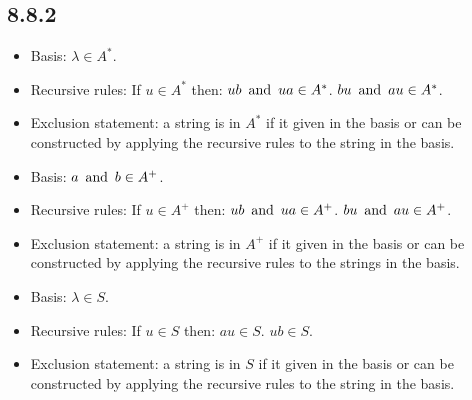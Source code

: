 \documentclass{article}
\begin{document}
\subsection*{8.8.2}
\begin{enumerate}
  \begin{itemize}
    \item Basis: $\lambda \in A^*$.
    \item Recursive rules: If $u \in A^*$ then:
           $ub \operatorname{~\text{and}~} ua \in A^*$.
           $bu \operatorname{~\text{and}~} au \in A^*$.
    \item Exclusion statement: a string is in $A^*$ if it given in the basis or can be constructed by applying the recursive rules to the string in the basis.
  \end{itemize}
  \begin{itemize}
    \item Basis: $a \operatorname{~\text{and}~} b \in A^+$.
    \item Recursive rules: If $u \in A^+$ then:
           $ub \operatorname{~\text{and}~} ua \in A^+$.
           $bu \operatorname{~\text{and}~} au \in A^+$.
    \item Exclusion statement: a string is in $A^+$ if it given in the basis or can be constructed by applying the recursive rules to the strings in the basis.
  \end{itemize}
  \begin{itemize}
    \item Basis: $\lambda \in S$.
    \item Recursive rules: If $u \in S$ then:
           $au \in S$.
           $ub \in S$.
    \item Exclusion statement: a string is in $S$ if it given in the basis or can be constructed by applying the recursive rules to the string in the basis.
  \end{itemize}
\end{enumerate}
\end{document}
